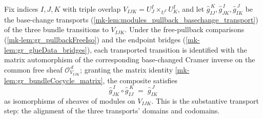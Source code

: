 \begin{lemma}\label{mk-lem:gr_bundleCocycle_transport}
  \leanok

  Fix indices \(I, J, K\) with triple overlap \(V_{IJK} = U^I_J \times_{U^I} U^I_K\),
  and let \(\widehat{g}_{IJ}^{\,K}, \widehat{g}_{JK}^{\,I}, \widehat{g}_{IK}^{\,J}\) be
  the base-change transports (\ref{mk-lem:modules_pullback_basechange_transport}) of the
  three bundle transitions to \(V_{IJK}\). Under the free-pullback comparisons
  (\ref{mk-lem:gr_pullbackFreeIso}) and the endpoint bridges
  (\ref{mk-lem:gr_glueData_bridges}), each transported transition is identified with the
  matrix automorphism of the corresponding base-changed Cramer inverse on the common
  free sheaf \(\mathcal{O}_{V_{IJK}}^{\,d}\); granting the matrix identity
  \ref{mk-lem:gr_bundleCocycle_matrix}, the composite satisfies
  \[
    \widehat{g}_{JK}^{\,I} \circ \widehat{g}_{IJ}^{\,K}
      \;=\; \widehat{g}_{IK}^{\,J}
  \]
  as isomorphisms of sheaves of modules on \(V_{IJK}\). This is the substantive
  transport step: the alignment of the three transports' domains and codomains.
\end{lemma}
